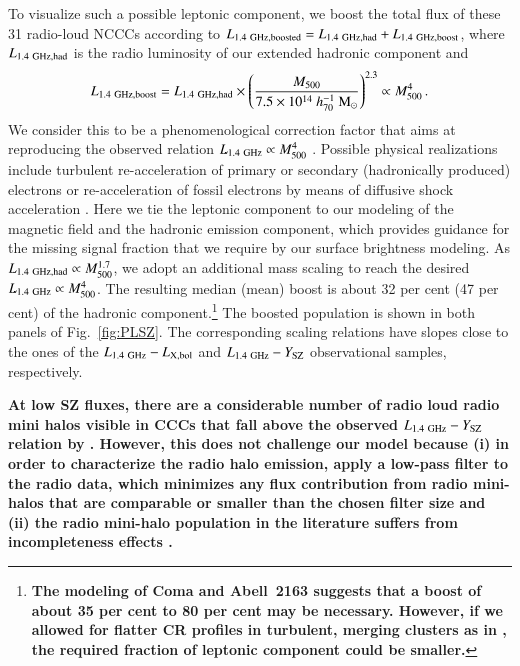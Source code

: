 \documentclass[useAMS,usenatbib]{mn2e}
\begin{document}
{  To visualize such a possible leptonic component, we boost the total flux of
  these 31 radio-loud NCCCs according to $L_{1.4~{\mathrm{GHz, boosted}}} =
  L_{1.4~{\mathrm{GHz, had}}} + L_{1.4~{\mathrm{GHz, boost}}}$, where $L_{1.4~{\mathrm{GHz,
      had}}}$ is the radio luminosity of our extended hadronic component and
\begin{equation}
L_{1.4~{\mathrm{GHz, boost}}} = L_{1.4~{\mathrm{GHz, had}}} \times 
\left( \frac{M_{500}}{7.5\times10^{14}~h_{70}^{-1}~{\mathrm{M}}_{\odot}} \right)^{2.3} \propto M_{500}^4 \, .
\label{eg:leptonic_boost}
\end{equation}
We consider this to be a phenomenological correction factor that aims at
reproducing the observed relation $L_{1.4~{\mathrm{GHz}}} \propto M_{500}^4$
\citep{2007MNRAS.378.1565C,2013arXiv1306.4379C}. Possible physical realizations
include turbulent re-acceleration of primary or secondary (hadronically
produced) electrons \citep{2010arXiv1008.0184B} or re-acceleration of fossil
electrons by means of diffusive shock acceleration
\citep{kang11,kang12,pinzke13}. Here we tie the leptonic component to our
modeling of the magnetic field and the hadronic emission component, which
provides guidance for the missing signal fraction that we require by our surface
brightness modeling. As $L_{1.4~{\mathrm{GHz, had}}} \propto M_{500}^{1.7}$, we adopt
an additional mass scaling to reach the desired $L_{1.4~{\mathrm{GHz}}} \propto
M_{500}^4$.  The resulting median (mean) boost is about 32 per cent (47 per
cent) of the hadronic component.\footnote{{\bf The modeling of Coma and
    Abell~2163 suggests that a boost of about 35 per cent to 80 per cent may be
    necessary. However, if we allowed for flatter CR profiles in turbulent,
    merging clusters as in \cite{2013arXiv1303.4746W}, the required fraction of
    leptonic component could be smaller.}}  The boosted population is shown in
both panels of Fig.~\ref{fig:PLSZ}. The corresponding scaling relations have
slopes close to the ones of the $L_{1.4~{\mathrm{GHz}}}-L_{{\mathrm{X,bol}}}$ and
$L_{1.4~{\mathrm{GHz}}}-Y_{{\mathrm{SZ}}}$ observational samples, respectively.}

{\bf At low SZ fluxes, there are a considerable number of radio loud radio mini
  halos visible in CCCs that fall above the observed
  $L_{1.4~{\mathrm{GHz}}}-Y_{{\mathrm{SZ}}}$ relation by
  \citet{2013arXiv1307.3049S}. However, this does not challenge our model
  because (i) in order to characterize the radio halo emission,
  \citet{2013arXiv1307.3049S} apply a low-pass filter to the radio data, which
  minimizes any flux contribution from radio mini-halos that are comparable or
  smaller than the chosen filter size and (ii) the radio mini-halo population in
  the literature suffers from incompleteness effects \citep{Giacintucci}.}
\end{document}
